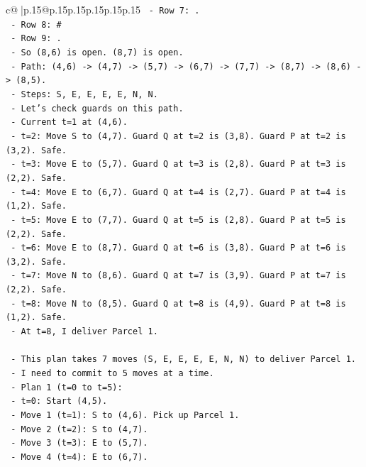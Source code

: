 \documentclass{article}
\begin{document}
{\begin{supertabular}{c@{$\;$}|p{.15\linewidth}@{}p{.15\linewidth}p{.15\linewidth}p{.15\linewidth}p{.15\linewidth}p{.15\linewidth}}
{{{\texttt{         {-} Row 7: .} \\
\texttt{         {-} Row 8: \#} \\
\texttt{         {-} Row 9: .} \\
\texttt{       {-} So (8,6) is open. (8,7) is open.} \\
\texttt{       {-} Path: (4,6) {-}> (4,7) {-}> (5,7) {-}> (6,7) {-}> (7,7) {-}> (8,7) {-}> (8,6) {-}> (8,5).} \\
\texttt{       {-} Steps: S, E, E, E, E, N, N.} \\
\texttt{       {-} Let's check guards on this path.} \\
\texttt{       {-} Current t=1 at (4,6).} \\
\texttt{       {-} t=2: Move S to (4,7). Guard Q at t=2 is (3,8). Guard P at t=2 is (3,2). Safe.} \\
\texttt{       {-} t=3: Move E to (5,7). Guard Q at t=3 is (2,8). Guard P at t=3 is (2,2). Safe.} \\
\texttt{       {-} t=4: Move E to (6,7). Guard Q at t=4 is (2,7). Guard P at t=4 is (1,2). Safe.} \\
\texttt{       {-} t=5: Move E to (7,7). Guard Q at t=5 is (2,8). Guard P at t=5 is (2,2). Safe.} \\
\texttt{       {-} t=6: Move E to (8,7). Guard Q at t=6 is (3,8). Guard P at t=6 is (3,2). Safe.} \\
\texttt{       {-} t=7: Move N to (8,6). Guard Q at t=7 is (3,9). Guard P at t=7 is (2,2). Safe.} \\
\texttt{       {-} t=8: Move N to (8,5). Guard Q at t=8 is (4,9). Guard P at t=8 is (1,2). Safe.} \\
\texttt{       {-} At t=8, I deliver Parcel 1.} \\
\\ 
\texttt{   {-} This plan takes 7 moves (S, E, E, E, E, N, N) to deliver Parcel 1.} \\
\texttt{   {-} I need to commit to 5 moves at a time.} \\
\texttt{   {-} Plan 1 (t=0 to t=5):} \\
\texttt{     {-} t=0: Start (4,5).} \\
\texttt{     {-} Move 1 (t=1): S to (4,6). Pick up Parcel 1.} \\
\texttt{     {-} Move 2 (t=2): S to (4,7).} \\
\texttt{     {-} Move 3 (t=3): E to (5,7).} \\
\texttt{     {-} Move 4 (t=4): E to (6,7).} \\
}}}
\end{supertabular}}
\end{document}
